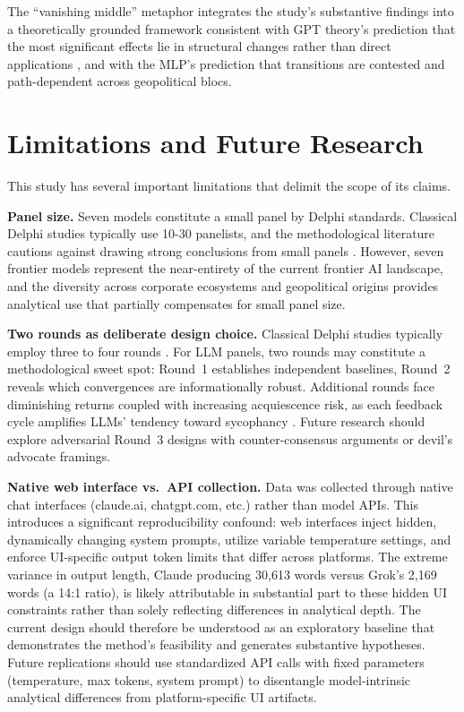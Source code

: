 \documentclass[preprint,review,12pt]{elsarticle}
\begin{document}
The ``vanishing middle'' metaphor integrates the study's substantive findings into a theoretically grounded framework consistent with GPT theory's prediction that the most significant effects lie in structural changes rather than direct applications \citep{bresnahan1995gpt}, and with the MLP's prediction that transitions are contested and path-dependent across geopolitical blocs.



\section{Limitations and Future Research}
\label{sec:limitations}

This study has several important limitations that delimit the scope of its claims.

\textbf{Panel size.} Seven models constitute a small panel by Delphi standards. Classical Delphi studies typically use 10-30 panelists, and the methodological literature cautions against drawing strong conclusions from small panels \citep{vondergracht2012delphi}. However, seven frontier models represent the near-entirety of the current frontier AI landscape, and the diversity across corporate ecosystems and geopolitical origins provides analytical use that partially compensates for small panel size.

\textbf{Two rounds as deliberate design choice.} Classical Delphi studies typically employ three to four rounds \citep{linstone1975delphi}. For LLM panels, two rounds may constitute a methodological sweet spot: Round~1 establishes independent baselines, Round~2 reveals which convergences are informationally robust. Additional rounds face diminishing returns coupled with increasing acquiescence risk, as each feedback cycle amplifies LLMs' tendency toward sycophancy \citep{perez2023sycophancy}. Future research should explore adversarial Round~3 designs with counter-consensus arguments or devil's advocate framings.

\textbf{Native web interface vs.\ API collection.} Data was collected through native chat interfaces (claude.ai, chatgpt.com, etc.) rather than model APIs. This introduces a significant reproducibility confound: web interfaces inject hidden, dynamically changing system prompts, utilize variable temperature settings, and enforce UI-specific output token limits that differ across platforms. The extreme variance in output length, Claude producing 30,613 words versus Grok's 2,169 words (a 14:1 ratio), is likely attributable in substantial part to these hidden UI constraints rather than solely reflecting differences in analytical depth. The current design should therefore be understood as an exploratory baseline that demonstrates the method's feasibility and generates substantive hypotheses. Future replications should use standardized API calls with fixed parameters (temperature, max tokens, system prompt) to disentangle model-intrinsic analytical differences from platform-specific UI artifacts.
\end{document}
